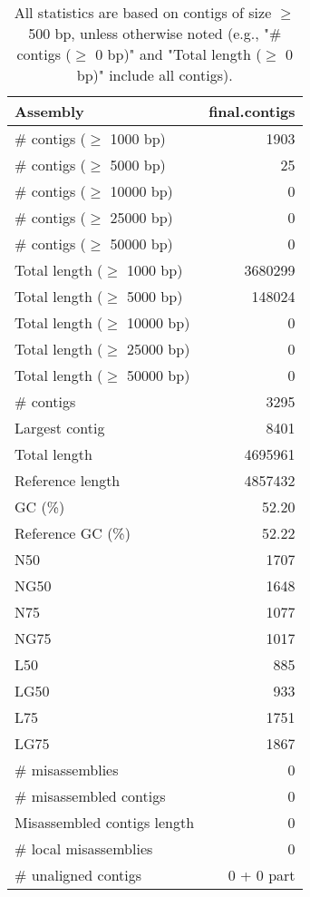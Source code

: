 \documentclass[12pt,a4paper]{article}
\begin{document}
\begin{table}[ht]
\begin{center}
\caption{All statistics are based on contigs of size $\geq$ 500 bp, unless otherwise noted (e.g., "\# contigs ($\geq$ 0 bp)" and "Total length ($\geq$ 0 bp)" include all contigs).}
\begin{tabular}{|l*{1}{|r}|}
\hline
Assembly & final.contigs \\ \hline
\# contigs ($\geq$ 1000 bp) & 1903 \\ \hline
\# contigs ($\geq$ 5000 bp) & 25 \\ \hline
\# contigs ($\geq$ 10000 bp) & 0 \\ \hline
\# contigs ($\geq$ 25000 bp) & 0 \\ \hline
\# contigs ($\geq$ 50000 bp) & 0 \\ \hline
Total length ($\geq$ 1000 bp) & 3680299 \\ \hline
Total length ($\geq$ 5000 bp) & 148024 \\ \hline
Total length ($\geq$ 10000 bp) & 0 \\ \hline
Total length ($\geq$ 25000 bp) & 0 \\ \hline
Total length ($\geq$ 50000 bp) & 0 \\ \hline
\# contigs & 3295 \\ \hline
Largest contig & 8401 \\ \hline
Total length & 4695961 \\ \hline
Reference length & 4857432 \\ \hline
GC (\%) & 52.20 \\ \hline
Reference GC (\%) & 52.22 \\ \hline
N50 & 1707 \\ \hline
NG50 & 1648 \\ \hline
N75 & 1077 \\ \hline
NG75 & 1017 \\ \hline
L50 & 885 \\ \hline
LG50 & 933 \\ \hline
L75 & 1751 \\ \hline
LG75 & 1867 \\ \hline
\# misassemblies & 0 \\ \hline
\# misassembled contigs & 0 \\ \hline
Misassembled contigs length & 0 \\ \hline
\# local misassemblies & 0 \\ \hline
\# unaligned contigs & 0 + 0 part \\ \hline

\end{tabular}
\end{center}
\end{table}
\end{document}
